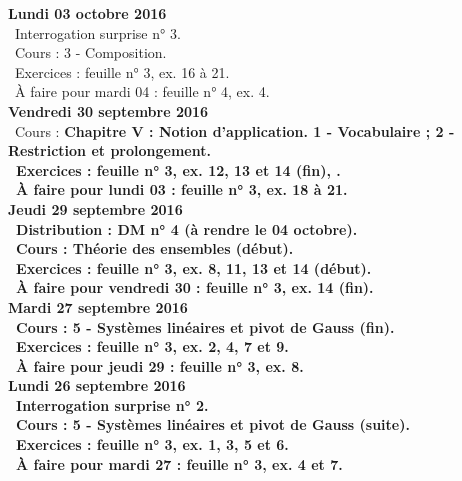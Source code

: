 \documentclass[12pt,a4paper]{article}
\begin{document}
\noindent\textbf{Lundi 03 octobre 2016}\\
\bu\ Interrogation surprise n° 3.\\
\bu\ Cours : 3 - Composition.\\
\bu\ Exercices : feuille n° 3, ex. 16 à 21.\\
\bu\ À faire pour mardi 04 : feuille n° 4, ex. 4.\vspace{.4cm}\\
  
\noindent\textbf{Vendredi 30 septembre 2016}\\
\bu\ Cours : \bf Chapitre V \rm : Notion d'application. 1 - Vocabulaire ; 2 - Restriction et prolongement.\\
\bu\ Exercices : feuille n° 3, ex. 12, 13 et 14 (fin), .\\
\bu\ À faire pour lundi 03 : feuille n° 3, ex. 18 à 21.\vspace{.4cm}\\

\noindent\textbf{Jeudi 29 septembre 2016}\\
\bu\ Distribution : DM n° 4 (à rendre le 04 octobre).\\
\bu\ Cours : Théorie des ensembles (début).\\
\bu\ Exercices : feuille n° 3, ex. 8, 11, 13 et 14 (début).\\
\bu\ À faire pour vendredi 30 : feuille n° 3, ex. 14 (fin).\vspace{.4cm}\\

\noindent\textbf{\bf Mardi 27 septembre 2016}\\
\bu\ Cours : 5 - Systèmes linéaires et pivot de Gauss (fin).\\
\bu\ Exercices : feuille n° 3, ex. 2, 4, 7 et 9.\\
\bu\ À faire pour jeudi 29 : feuille n° 3, ex. 8.\vspace{.4cm}\\

\noindent\textbf{Lundi 26 septembre 2016}\\
\bu\ Interrogation surprise n° 2.\\
\bu\ Cours : 5 - Systèmes linéaires et pivot de Gauss (suite).\\
\bu\ Exercices : feuille n° 3, ex. 1, 3, 5 et 6.\\
\bu\ À faire pour mardi 27 : feuille n° 3, ex. 4 et 7.\vspace{.4cm}\\
\end{document}
